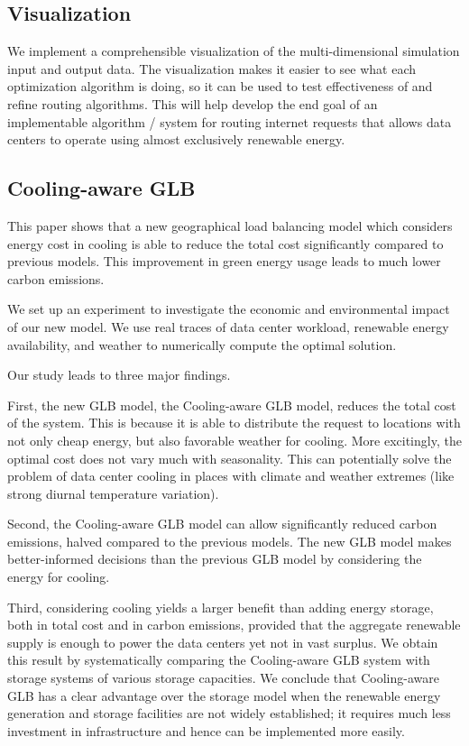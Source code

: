 \documentclass{acm_proc_article-sp}
\begin{document}
\subsection{Visualization}
We implement a comprehensible visualization of the multi-dimensional simulation input and output data. The visualization makes it easier to see what each optimization algorithm is doing, so it can be used to test effectiveness of and refine routing algorithms. This will help develop the end goal of an implementable algorithm / system for routing internet requests that allows data centers to operate using almost exclusively renewable energy.

\subsection{Cooling-aware GLB}

This paper shows that a new geographical load balancing model which considers energy cost in cooling is able to reduce the total cost significantly compared to previous models. This improvement in green energy usage leads to much lower carbon emissions.

We set up an experiment to investigate the economic and environmental impact of our new model. We use real traces of data center workload, renewable energy availability, and weather to numerically compute the optimal solution.%

Our study leads to three major findings.

First, the new GLB model, the Cooling-aware GLB model, reduces the total cost of the system. This is because it is able to distribute the request to locations with not only cheap energy, but also favorable weather for cooling. More excitingly, the optimal cost does not vary much with seasonality. This can potentially solve the problem of data center cooling in places with climate and weather extremes (like strong diurnal temperature variation).

Second, the Cooling-aware GLB model can allow significantly reduced carbon emissions, halved compared to the previous models. The new GLB model makes better-informed decisions than the previous GLB model by considering the energy for cooling.

Third, considering cooling yields a larger benefit than adding energy storage, both in total cost and in carbon emissions, provided that the aggregate renewable supply is enough to power the data centers yet not in vast surplus. We obtain this result by systematically comparing the Cooling-aware GLB system with storage systems of various storage capacities. We conclude that Cooling-aware GLB has a clear advantage over the storage model when the renewable energy generation and storage facilities are not widely established; it requires much less investment in infrastructure and hence can be implemented more easily.
\end{document}
